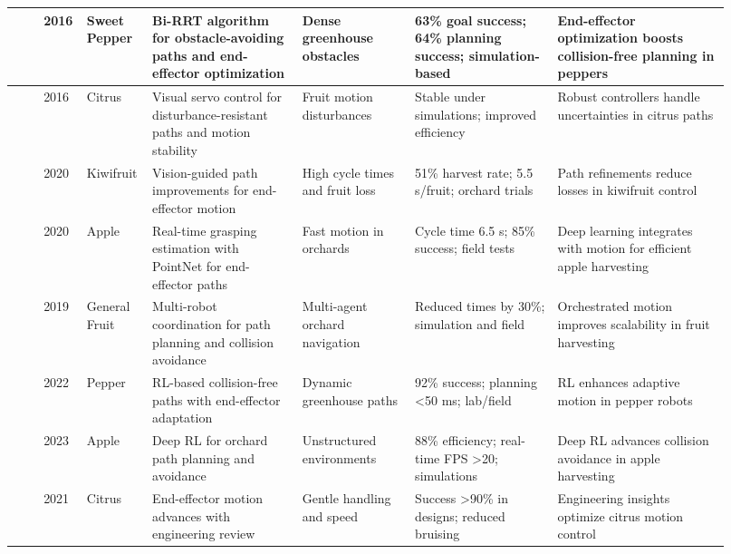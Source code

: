 \documentclass{ieeeaccess}
\begin{document}
\begin{table}[htbp]
\begin{tabular}{p{0.04\linewidth} p{0.04\linewidth} p{0.07\linewidth} p{0.20\linewidth} p{0.15\linewidth} p{0.19\linewidth} p{0.23\linewidth}}
\cite{bac2016analysis} & 2016 & Sweet Pepper & Bi-RRT algorithm for obstacle-avoiding paths and end-effector optimization & Dense greenhouse obstacles & 63\% goal success; 64\% planning success; simulation-based & End-effector optimization boosts collision-free planning in peppers \\ \midrule
\cite{mehta2016robust} & 2016 & Citrus & Visual servo control for disturbance-resistant paths and motion stability & Fruit motion disturbances & Stable under simulations; improved efficiency & Robust controllers handle uncertainties in citrus paths \\ \midrule
\cite{williams2020improvements} & 2020 & Kiwifruit & Vision-guided path improvements for end-effector motion & High cycle times and fruit loss & 51\% harvest rate; 5.5 s/fruit; orchard trials & Path refinements reduce losses in kiwifruit control \\ \midrule
\cite{kang2020real} & 2020 & Apple & Real-time grasping estimation with PointNet for end-effector paths  & Fast motion in orchards & Cycle time 6.5 s; 85\% success; field tests & Deep learning integrates with motion for efficient apple harvesting \\ \midrule
\cite{vougioukas2019orchestra} & 2019 & General Fruit & Multi-robot coordination for path planning and collision avoidance  & Multi-agent orchard navigation & Reduced times by 30\%; simulation and field & Orchestrated motion improves scalability in fruit harvesting \\ \midrule
\cite{verbiest2022path} & 2022 & Pepper & RL-based collision-free paths with end-effector adaptation  & Dynamic greenhouse paths & 92\% success; planning <50 ms; lab/field & RL enhances adaptive motion in pepper robots \\ \midrule
\cite{zhang2023deep} & 2023 & Apple & Deep RL for orchard path planning and avoidance & Unstructured environments & 88\% efficiency; real-time FPS >20; simulations & Deep RL advances collision avoidance in apple harvesting \\ \midrule
\cite{burks2021engineering} & 2021 & Citrus & End-effector motion advances with engineering review  & Gentle handling and speed & Success >90\% in designs; reduced bruising & Engineering insights optimize citrus motion control \\ 
\bottomrule
\end{tabular}
\end{table}
\end{document}

